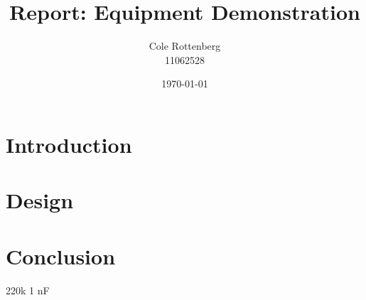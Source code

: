 \documentclass{article}
\title{Report: Equipment Demonstration}
\author{Cole Rottenberg \\ 11062528}
\date{\today}
\begin{document}
\maketitle

\section*{Introduction}

\section*{Design}


\section*{Conclusion}
220k 
1 nF
\end{document}
